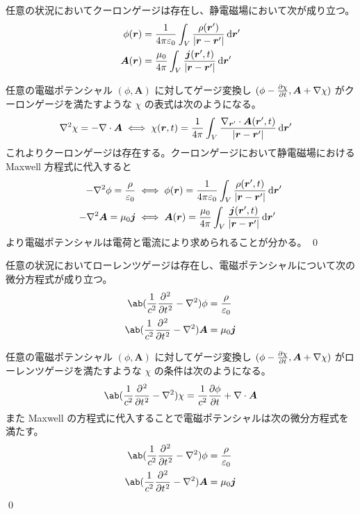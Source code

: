 \documentclass[uplatex,dvipdfmx,a4paper,11pt]{jlreq}
\makeatletter
\renewcommand{\AA}{\bm{A}}
\newcommand{\rr}{\bm{r}}
\newcommand{\vnabla}{\mathbf{\nabla}}
\newcommand{\laplacian}{\nabla^2}
\numberwithin{equation}{section}
\theoremstyle{definition}
\renewenvironment{proof}[1][\proofname]{\par
  \normalfont
  \topsep6\p@\@plus6\p@ \trivlist
  \item[\hskip\labelsep{\bfseries #1}\@addpunct{\bfseries}]\ignorespaces\quad\par
}{%
  \qed\endtrivlist\@endpefalse
}
\renewcommand\proofname{証明}
\makeatother
\begin{document}
\begin{proposition}
  任意の状況においてクーロンゲージは存在し、静電磁場において次が成り立つ。
  \begin{align}
    \phi(\rr) & = \frac{1}{4\pi\varepsilon_0}\int_V\frac{\rho(\rr')}{|\rr - \rr'|}\dl{\rr'} \\
    \AA(\rr)  & = \frac{\mu_0}{4\pi}\int_V\frac{\bm{j}(\rr', t)}{|\rr - \rr'|}\dl{\rr'}
  \end{align}
\end{proposition}
\begin{proof}
  任意の電磁ポテンシャル $(\phi, \AA)$ に対してゲージ変換し $(\phi - \diffp{\chi}{t}, \AA + \vnabla\chi)$ がクーロンゲージを満たすような $\chi$ の表式は次のようになる。
  \begin{align}
    \laplacian\chi & = -\vnabla\cdot\AA \iff \chi(\rr, t) = \frac{1}{4\pi}\int_V\frac{\vnabla_{\rr'}\cdot\AA(\rr', t)}{|\rr - \rr'|}\dl{\rr'}
  \end{align}
  これよりクーロンゲージは存在する。クーロンゲージにおいて静電磁場における Maxwell 方程式に代入すると
  \begin{align}
    -\laplacian\phi = \frac{\rho}{\varepsilon_0} & \iff \phi(\rr) = \frac{1}{4\pi\varepsilon_0}\int_V\frac{\rho(\rr', t)}{|\rr - \rr'|}\dl{\rr'} \\
    -\laplacian\AA = \mu_0\bm{j}                 & \iff \AA(\rr)  = \frac{\mu_0}{4\pi}\int_V\frac{\bm{j}(\rr', t)}{|\rr - \rr'|}\dl{\rr'}
  \end{align}
  より電磁ポテンシャルは電荷と電流により求められることが分かる。
\end{proof}

\begin{proposition}
  任意の状況においてローレンツゲージは存在し、電磁ポテンシャルについて次の微分方程式が成り立つ。
  \begin{align}
    \ab(\frac{1}{c^2}\diffp[2]{}{t} - \laplacian)\phi & = \frac{\rho}{\varepsilon_0} \\
    \ab(\frac{1}{c^2}\diffp[2]{}{t} - \laplacian)\AA  & = \mu_0\bm{j}
  \end{align}
\end{proposition}
\begin{proof}
  任意の電磁ポテンシャル $(\phi, \AA)$ に対してゲージ変換し $(\phi - \diffp{\chi}{t}, \AA + \vnabla\chi)$ がローレンツゲージを満たすような $\chi$ の条件は次のようになる。
  \begin{align}
    \ab(\frac{1}{c^2}\diffp[2]{}{t} - \laplacian)\chi = \frac{1}{c^2}\diffp{\phi}{t} + \vnabla\cdot\AA
  \end{align}
  また Maxwell の方程式に代入することで電磁ポテンシャルは次の微分方程式を満たす。
  \begin{align}
    \ab(\frac{1}{c^2}\diffp[2]{}{t} - \laplacian)\phi & = \frac{\rho}{\varepsilon_0} \\
    \ab(\frac{1}{c^2}\diffp[2]{}{t} - \laplacian)\AA  & = \mu_0\bm{j}
  \end{align}
\end{proof}
\end{document}
